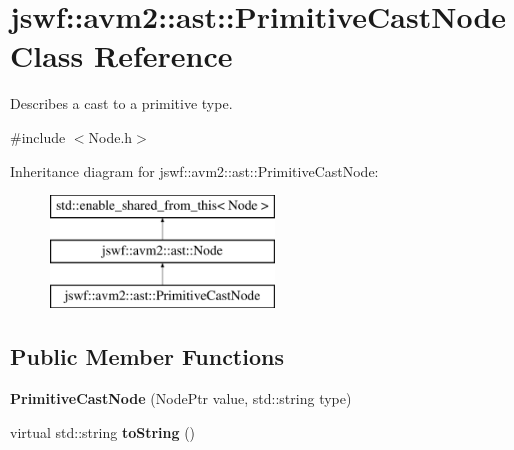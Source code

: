 \hypertarget{classjswf_1_1avm2_1_1ast_1_1_primitive_cast_node}{\section{jswf\+:\+:avm2\+:\+:ast\+:\+:Primitive\+Cast\+Node Class Reference}
\label{classjswf_1_1avm2_1_1ast_1_1_primitive_cast_node}
}


Describes a cast to a primitive type.  




{\ttfamily \#include $<$Node.\+h$>$}

Inheritance diagram for jswf\+:\+:avm2\+:\+:ast\+:\+:Primitive\+Cast\+Node\+:\begin{figure}[H]
\begin{center}
\leavevmode
\includegraphics[height=3.000000cm]{classjswf_1_1avm2_1_1ast_1_1_primitive_cast_node}
\end{center}
\end{figure}
\subsection*{Public Member Functions}
\begin{DoxyCompactItemize}
\item 
\hypertarget{classjswf_1_1avm2_1_1ast_1_1_primitive_cast_node_af9549678dad21f9a22735744549845d2}{{\bfseries Primitive\+Cast\+Node} (Node\+Ptr value, std\+::string type)}\label{classjswf_1_1avm2_1_1ast_1_1_primitive_cast_node_af9549678dad21f9a22735744549845d2}

\item 
\hypertarget{classjswf_1_1avm2_1_1ast_1_1_primitive_cast_node_a8cae0f80eabaf0d1048565c674c0d085}{virtual std\+::string {\bfseries to\+String} ()}\label{classjswf_1_1avm2_1_1ast_1_1_primitive_cast_node_a8cae0f80eabaf0d1048565c674c0d085}

\end{DoxyCompactItemize}
